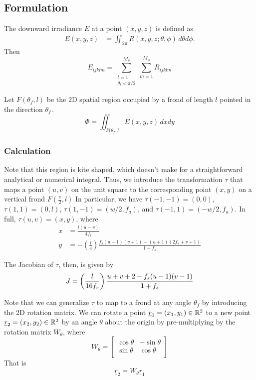 \subsection{Formulation}
The downward irradiance $E$  at a point $(x,y,z)$ is defined as
\begin{align}
	E(x,y,z) &= \iint_{2\pi} R(x,y,z;\theta,\phi)\,d\theta d\phi.
\end{align}
Then
\begin{equation}
	E_{ijklm}= \sum_{\substack{l=1 \\ \theta_l < \pi/2}}^{M_\theta}\sum_{m=1}^{M_\phi} R_{ijklm}
\end{equation}

Let $F(\theta_f,l)$ be the 2D spatial region occupied by a frond of length $l$ pointed in the direction $\theta_f$.
\begin{equation}
	\Phi = \iint_{F(\theta_f,l} E(x,y,z)\,dxdy
\end{equation}

\subsubsection{Calculation}
Note that this region is kite shaped, which doesn't make for a straightforward analytical or numerical integral.
Thus, we introduce the transformation $\tau$ that maps a point $(u,v)$ on the unit square to the corresponding point $(x,y)$ on a vertical frond $F(\frac{\pi}{2},l)$
In particular, we have $\tau(-1,-1) = (0,0)$, $\tau(1,1) = (0,l)$, $\tau(1,-1) = (w/2,f_a)$, and $\tau(-1,1) = (-w/2,f_a)$.
In full, $\tau(u,v) = (x,y)$, where
\begin{align}
	x &= \frac{l(u-v)}{4f_r} \\
	y &= -\left(\frac{l}{4}\right) \frac{f_s(u-1)(v+1) - (u+1)(2f_s + v + 1)}{1+f_s}
\end{align}

The Jacobian of $\tau$, then, is given by
\begin{equation}
	J = \left(\frac{l}{16f_r}\right) \frac{u + v + 2 - f_s(u-1)(v-1)}{1+f_s} \\
\end{equation}

Note that we can generalize $\tau$ to map to a frond at any angle $\theta_f$ by introducing the 2D rotation matrix.
We can rotate a point $\underline{r}_1 = (x_1,y_1) \in \mathbb{R}^2$ to a new point $\underline{r}_2 = (x_2,y_2) \in \mathbb{R}^2$ by an angle $\theta$ about the origin by pre-multiplying by the rotation matrix $W_{\theta}$, where
\begin{equation}
	W_{\theta} = \left[ \begin{array}{cc}
		\cos\theta & -\sin\theta \\
		\sin\theta & \cos\theta \\
	\end{array} \right]
\end{equation}
That is
\begin{equation}
	\underline{r}_2 = W_{\theta} \underline{r}_1
\end{equation}

